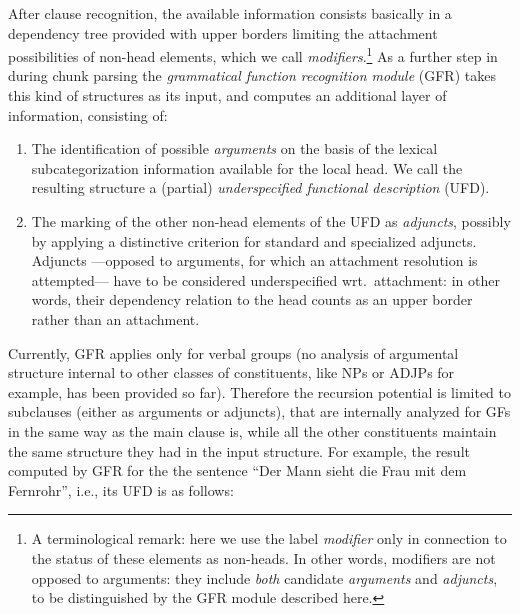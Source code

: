 After clause recognition, the available information consists basically in a
dependency tree provided with upper borders limiting the attachment
possibilities of non-head elements, which we call {\em modifiers}.\footnote{A
terminological remark: here we use the label {\em modifier} only in connection
to the status of these elements as non-heads. 
In other words, modifiers are not opposed to arguments: they include {\em
both} candidate {\em arguments} and {\em adjuncts}, to be distinguished by the
GFR module described here.} As a further step in during chunk parsing
the {\em grammatical
function recognition module} (GFR) takes this kind of structures as its input,
and computes an additional layer of information, consisting of:

\begin{enumerate}
\item   The identification of possible {\em arguments} on the basis of
        the lexical subcategorization information available for the
        local head. We call the resulting structure a (partial)
        {\em underspecified functional description} (UFD).

\item   The marking of the other non-head elements of the UFD as {\em
        adjuncts}, possibly       
        by applying a distinctive criterion for standard and specialized
        adjuncts. Adjuncts ---opposed to arguments, for which an attachment
        resolution is attempted--- have to be considered underspecified
        wrt.~attachment: in other words, their dependency relation to the head
        counts as an upper border rather than an attachment.
\end{enumerate}

Currently, GFR applies only for verbal groups (no analysis of argumental
structure internal to other classes of constituents, like NPs or ADJPs for
example, has been provided so far). Therefore the recursion potential
is limited to subclauses (either as arguments or adjuncts), that are
internally analyzed for GFs in the same way as the main clause is,
while all the other constituents maintain the same structure they had
in the input structure. For example, the result computed by GFR for the 
the sentence ``Der Mann sieht die Frau mit dem Fernrohr'', i.e., its
UFD is as follows:

